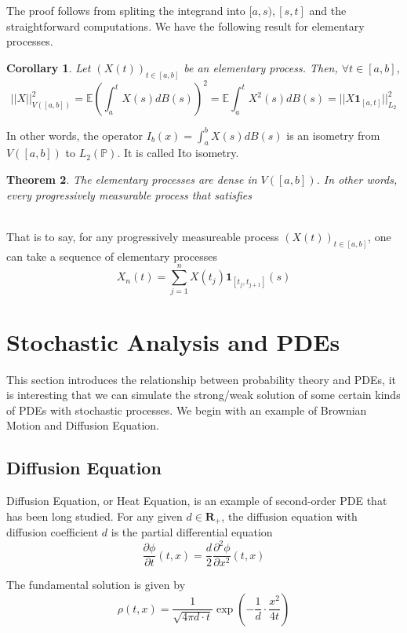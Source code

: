 \documentclass[11pt,english]{smfart}
\newtheorem{theorem}{Theorem}[subsection]
\newtheorem{corollary}[theorem]{Corollary}
\newcommand{\mb}{\mathbb}
\newcommand{\mf}{\mathbf}
\begin{document}
The proof follows from spliting the integrand into $[a,s),[s,t]$ and the straightforward computations. We have the following result for elementary processes. \\

\begin{corollary}
    Let $(X(t))_{t\in [a,b]}$ be an elementary process. Then, $\forall t\in [a,b]$, $$||X||_{V([a,b])}^2 = \mb{E}\left(\int_a^t X(s) dB(s)\right)^2 = \mb{E}\int_a^t X^2(s) dB(s) = ||X\mf{1}_{[a,t]}||^2_{L_2}$$
\end{corollary}

In other words, the operator $I_b(x) = \int_a^b X(s)dB(s)$ is an isometry from $V([a,b])$ to $L_2(\mb{P})$. It is called Ito isometry. \\

\begin{theorem}
    The elementary processes are dense in $V([a,b])$. In other words, every progressively measurable process that satisfies 
\end{theorem}\\

That is to say, for any progressively measureable process  $(X(t))_{t\in [a,b]}$, one can take a sequence of elementary processes $$X_n(t) = \sum_{j=1}^n X(t_j) \mf{1}_{[t_j,t_{j+1}]}(s)$$


\newpage
\section{Stochastic Analysis and PDEs}
This section introduces the relationship between probability theory and PDEs, it is interesting that we can simulate the strong/weak solution of some certain kinds of PDEs with stochastic processes. We begin with an example of Brownian Motion and Diffusion Equation. 



\subsection{Diffusion Equation} Diffusion Equation, or Heat Equation, is an example of second-order PDE that has been long studied. For any given $d\in \mf{R}_+$, the diffusion equation with diffusion coefficient $d$ is the partial differential equation $$\frac{\partial \phi}{\partial t}(t,x) = \frac{d}{2}\frac{\partial^2 \phi}{\partial x^2}(t,x)$$

The fundamental solution is given by $$\rho(t,x) = \frac{1}{\sqrt{4\pi d\cdot t}}\exp\left(-\frac{1}{d}\cdot\frac{x^2}{4 t}\right)$$
\end{document}
